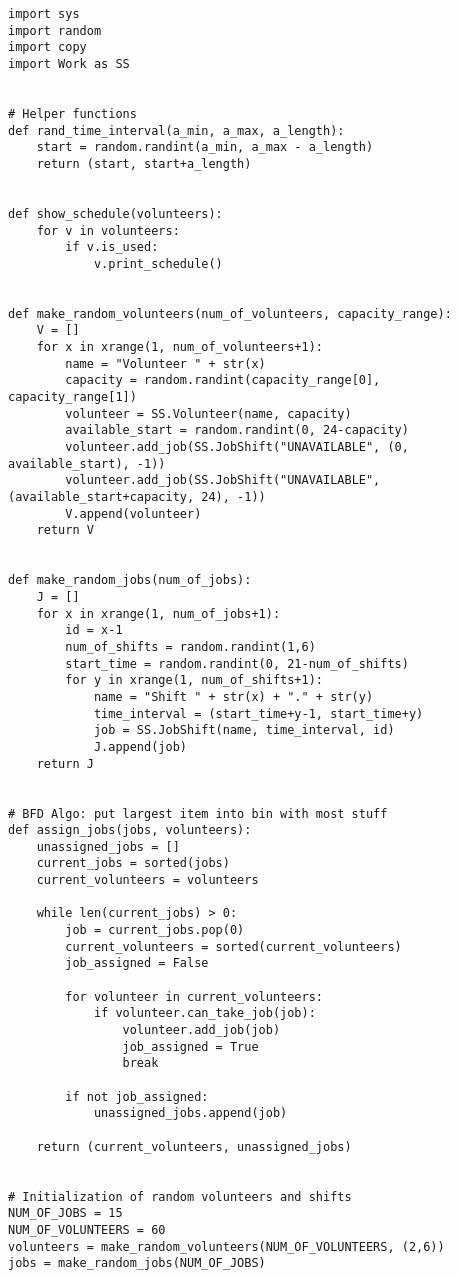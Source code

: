 \documentclass[11pt]{article}
\theoremstyle{definition}
\begin{document}
\begin{lstlisting}
import sys
import random
import copy
import Work as SS


# Helper functions
def rand_time_interval(a_min, a_max, a_length):
    start = random.randint(a_min, a_max - a_length)
    return (start, start+a_length)


def show_schedule(volunteers):
    for v in volunteers:
        if v.is_used:
            v.print_schedule()


def make_random_volunteers(num_of_volunteers, capacity_range):
    V = []
    for x in xrange(1, num_of_volunteers+1):
        name = "Volunteer " + str(x)
        capacity = random.randint(capacity_range[0], capacity_range[1])
        volunteer = SS.Volunteer(name, capacity)
        available_start = random.randint(0, 24-capacity)
        volunteer.add_job(SS.JobShift("UNAVAILABLE", (0, available_start), -1))
        volunteer.add_job(SS.JobShift("UNAVAILABLE", (available_start+capacity, 24), -1))
        V.append(volunteer)
    return V


def make_random_jobs(num_of_jobs):
    J = []
    for x in xrange(1, num_of_jobs+1):
        id = x-1
        num_of_shifts = random.randint(1,6)
        start_time = random.randint(0, 21-num_of_shifts)
        for y in xrange(1, num_of_shifts+1):
            name = "Shift " + str(x) + "." + str(y)
            time_interval = (start_time+y-1, start_time+y)
            job = SS.JobShift(name, time_interval, id)
            J.append(job)
    return J


# BFD Algo: put largest item into bin with most stuff
def assign_jobs(jobs, volunteers):
    unassigned_jobs = []
    current_jobs = sorted(jobs)
    current_volunteers = volunteers

    while len(current_jobs) > 0:
        job = current_jobs.pop(0)
        current_volunteers = sorted(current_volunteers)
        job_assigned = False

        for volunteer in current_volunteers:
            if volunteer.can_take_job(job):
                volunteer.add_job(job)
                job_assigned = True
                break

        if not job_assigned:
            unassigned_jobs.append(job)

    return (current_volunteers, unassigned_jobs)


# Initialization of random volunteers and shifts
NUM_OF_JOBS = 15
NUM_OF_VOLUNTEERS = 60
volunteers = make_random_volunteers(NUM_OF_VOLUNTEERS, (2,6))
jobs = make_random_jobs(NUM_OF_JOBS)



\end{lstlisting}
\end{document}
